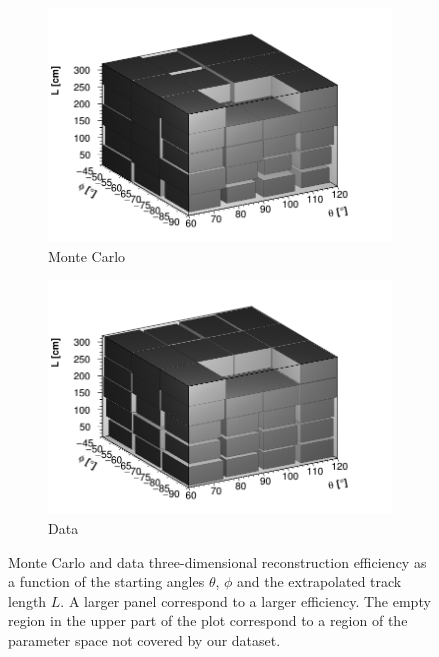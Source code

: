\documentclass[a4paper]{scrartcl}
\begin{document}
\begin{figure}[htbp]
  \begin{subfigure}{0.52\textwidth}
    \includegraphics[width=\linewidth]{figures/3d_mc.png}
    \caption{Monte Carlo} \label{fig:3d_mc}
  \end{subfigure}
  \begin{subfigure}{0.52\textwidth}
    \includegraphics[width=\linewidth]{figures/3d_data.png}
    \caption{Data} \label{fig:3d_data}
  \end{subfigure}
  \caption{Monte Carlo and data three-dimensional reconstruction efficiency as a function of the starting angles $\theta$, $\phi$ and the extrapolated track length $L$. A larger panel correspond to a larger efficiency. The empty region in the upper part of the plot correspond to a region of the parameter space not covered by our dataset.}\label{fig:3d}
\end{figure}
\end{document}
